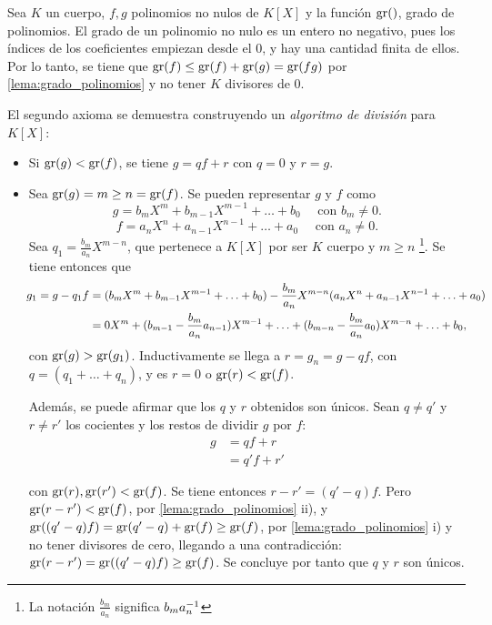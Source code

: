 \begin{dem}{\cite[p.~53]{Rosenberger}}
    Sea $K$ un cuerpo, $f,g$ polinomios no nulos de $K[X]$ y la función $\text{gr}()$, grado de polinomios. El grado de un polinomio no nulo es un entero no negativo, pues los índices de los coeficientes empiezan desde el 0, y hay una cantidad finita de ellos. Por lo tanto, se tiene que $\text{gr}(f) \leq \text{gr}(f) + \text{gr}(g) = \text{gr}(fg)$ por \ref{lema:grado_polinomios} y no tener $K$ divisores de 0.
    \item El segundo axioma se demuestra construyendo un \textit{algoritmo de división} para \textit{$K[X]$}:
    \begin{itemize}
        \item Si $\text{gr}(g) < \text{gr}(f)$, se tiene $g = qf + r$ con $q = 0$ y $r = g$.
        \item Sea $\text{gr}(g)  = m\geq n =\text{gr}(f)$. Se pueden representar $g$ y $f$ como
        \vspace{-0.2em}
            \[ g = b_mX^m + b_{m-1}X^{m-1} +\ldots + b_0 \quad \text{ con } b_m \neq 0.\]
            \[ f = a_nX^n + a_{n-1}X^{n-1} +\ldots + a_0 \quad \text{ con } a_n \neq 0.\]
            Sea $q_1 = \frac{b_m}{a_n}X^{m-n}$, que pertenece a $K[X]$ por ser $K$ cuerpo y $m\geq n$ \footnote{La notación $\frac{b_m}{a_n}$ significa $b_ma_n^{-1}$}. Se tiene entonces que 
            \vspace{-1em}
            \begin{align*}
             \hspace{-2.6pt}g_1 = g - q_1f &= (b_mX^m + b_{m-1}X^{m-1} +\ldots + b_0) -\frac{b_m}{a_n}X^{m-n}(a_nX^n + a_{n-1}X^{n-1} +\ldots + a_0)\\
             &= 0X^m + (b_{m-1}-\frac{b_m}{a_n}a_{n-1})X^{m-1} + \ldots + (b_{m-n}-\frac{b_{m}}{a_n}a_{0})X^{m-n} + \ldots + b_0,
        \end{align*}
        con $\text{gr}(g) > \text{gr}(g_1)$. Inductivamente se llega a $r = g_n = g - qf$, con $q = (q_1 + \ldots + q_n)$, y es $r = 0$ o $\text{gr}(r) < \text{gr}(f)$.

        Además, se puede afirmar que los $q$ y $r$ obtenidos son únicos. Sean $q \neq q'$ y $r\neq r'$ los cocientes y los restos de dividir $g$ por $f$:
        \vspace{-1em}
            \begin{align*}
             g &= qf + r\\
                &= q'f + r'
            \end{align*}
        
        con $\text{gr}(r), \text{gr}(r') < \text{gr}(f)$. Se tiene entonces $r - r' = (q'-q)f$. Pero $\text{gr}(r-r') < \text{gr}(f)$, por \ref{lema:grado_polinomios} ii), y $\text{gr}((q'-q)f) = \text{gr}(q'-q) + \text{gr}(f) \geq \text{gr}(f)$, por \ref{lema:grado_polinomios} i) y no tener divisores de cero, llegando a una contradicción: $\text{gr}(r-r')  = \text{gr}((q'-q)f) \geq \text{gr}(f)$. Se concluye por tanto que $q$ y $r$ son únicos.
    \end{itemize}
\end{dem}


